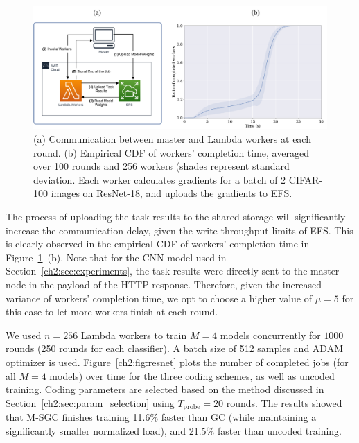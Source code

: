 \begin{figure}[!h]
    \centering
    \includegraphics[width=\textwidth]{figs/ch2/resnet_aws.pdf}
    \caption{ (a) Communication between master and Lambda workers at each round. (b) Empirical CDF of workers’ completion time, averaged over 100 rounds and 256 workers (shades represent standard deviation. Each worker calculates gradients for a batch of 2 CIFAR-100 images on ResNet-18, and uploads the gradients to EFS.}
    \label{ch2:fig:resnet_aws}
\end{figure}

The process of uploading the task results to the shared storage will significantly increase the communication delay, given the write throughput limits of EFS. This is clearly observed in the empirical CDF of workers’ completion time in Figure~\ref{ch2:fig:resnet_aws}~(b). Note that for the CNN model used in Section~\ref{ch2:sec:experiments}, the task results were directly sent to the master node in the payload of the HTTP response. Therefore, given the increased variance of workers' completion time, we opt to choose a higher value of $\mu=5$ for this case to let more workers finish at each round.

We used $n=256$ Lambda workers to train $M=4$ models concurrently for $1000$ rounds (250 rounds for each classifier). A batch size of 512 samples and ADAM optimizer is used. Figure~\ref{ch2:fig:resnet} plots the number of completed jobs (for all $M = 4$ models) over time for the three coding schemes, as well as uncoded training. Coding parameters are selected based on the method discussed in Section~\ref{ch2:sec:param_selection} using $T_\text{probe}=20$ rounds. The results showed that M-SGC finishes training 11.6\% faster than GC (while maintaining a significantly smaller normalized load), and 21.5\% faster than uncoded training.

